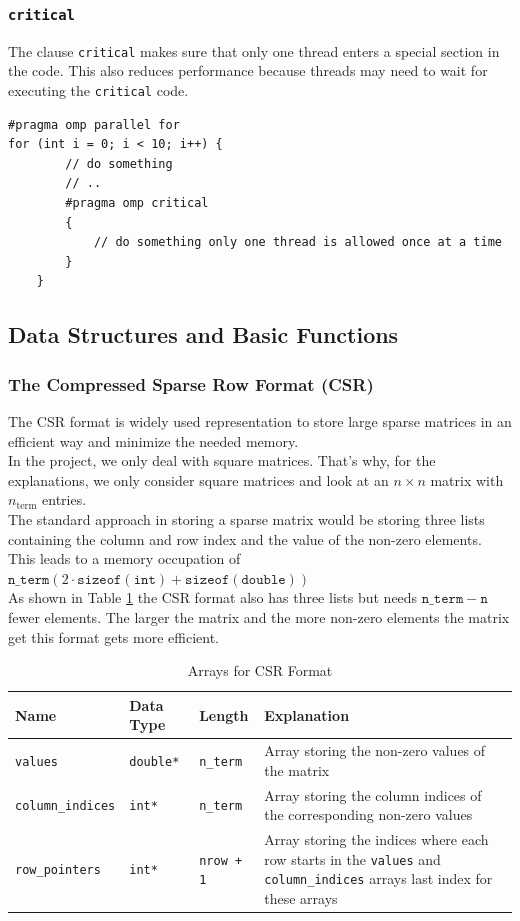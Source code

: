 \documentclass{article}
\begin{document}
\subsubsection{\texttt{critical}}
The clause \texttt{critical} makes sure that only one thread enters a special section in the code. This also reduces performance because threads may need to wait for executing the \texttt{critical} code.
\begin{verbatim}
#pragma omp parallel for
for (int i = 0; i < 10; i++) {
        // do something
        // ..
        #pragma omp critical
        {
            // do something only one thread is allowed once at a time
        }
    }
\end{verbatim}

\subsection{Data Structures and Basic Functions}
\subsubsection{The Compressed Sparse Row Format (CSR)}
The CSR format is widely used representation to store large sparse matrices in an efficient way and minimize the needed memory.\\
In the project, we only deal with square matrices. That's why, for the explanations, we only consider square matrices and look at an $n \times n$ matrix with $n_{\text{term}}$ entries.\\
The standard approach in storing a sparse matrix would be storing three lists containing the column and row index and the value of the non-zero elements. This leads to a memory occupation of $\mathtt{n\_{term}}  (2\cdot\mathtt{sizeof(int)} + \mathtt{sizeof(double)})$\\
As shown in Table \ref{tab:CSR} the CSR format also has three lists but needs $\mathtt{n\_term} - \mathtt{n}$ fewer elements. The larger the matrix and the more non-zero elements the matrix get this format gets more efficient. 
\begin{table}[h]
\centering
\renewcommand{\arraystretch}{1.5}
\begin{tabular}{|p{3cm}|p{2cm}|p{2cm}|p{9cm}|}
\hline
\rowcolor{gray!20}
\textbf{Name} & \textbf{Data Type} & \textbf{Length} & \textbf{Explanation} \\
\hline
\lstinline|values| & \lstinline|double*| & \lstinline|n_term| & Array storing the non-zero values of the matrix \\
\hline
\lstinline|column_indices| & \lstinline|int*| & \lstinline|n_term| & Array storing the column indices of the corresponding non-zero values \\
\hline
\lstinline|row_pointers| & \lstinline|int*| & \lstinline|nrow + 1| & Array storing the indices where each row starts in the \lstinline|values| and \lstinline|column_indices| arrays last index for these arrays\\
\hline
\end{tabular}
\caption{Arrays for CSR Format}
\label{tab:CSR}
\end{table}
\end{document}
